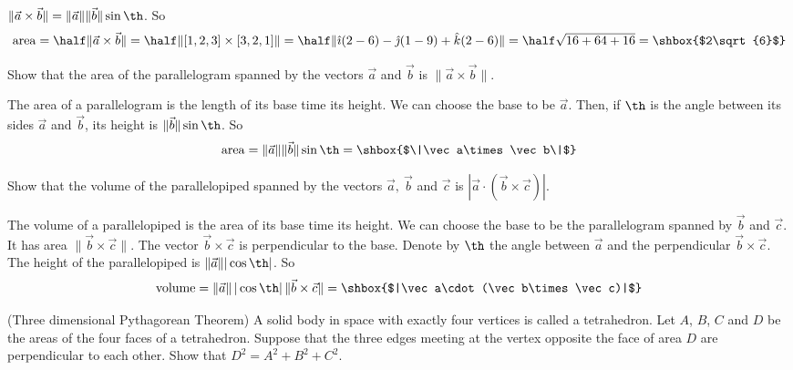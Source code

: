 { $\|\vec a\times\vec b\|=\|\vec a\|\|\vec b\|\sin\th$. So
$$
{\rm area} = \half\|\vec a\times\vec b\|
=\half\|[1,2,3]\times[3,2,1]\|
=\half\| \hat \imath(2-6)-\hat\jmath(1-9) +\hat k(2-6)  \|
=\half\sqrt{16+64+16}=\shbox{$2\sqrt{6}$}
$$
\medskip
\item{\next} Show that the area of the parallelogram spanned by the
vectors $\vec a$ and $\vec b$ is $\|\vec a\times \vec b\|$.
\smallskip\item{}\soln The area of a parallelogram is the length of its
base time its height. We can choose the base to be $\vec a$. Then, if $\th$
is the angle between its sides $\vec a$ and $\vec b$, its height is 
$\|\vec b\|\sin\th$.  
So
$$
{\rm area} = \|\vec a\|\|\vec b\|\sin\th=\shbox{$\|\vec a\times\vec b\|$}
$$
\medskip
\item{\next} Show that the volume of the parallelopiped spanned by the
vectors $\vec a,\ \vec b$ and $\vec c$ is $|\vec a\cdot(\vec b\times\vec
c)|$.
\smallskip\item{}\soln The volume of a parallelopiped is the area of its
base time its height. We can choose the base to be the parallelogram 
spanned by $\vec b$ and $\vec c$. It has area $\|\vec b\times\vec c\|$.
The vector $\vec b\times\vec c$ is perpendicular to the base. Denote by
$\th$ the angle between $\vec a$ and the perpendicular $\vec b\times\vec c$.
The height of the parallelopiped is $\|\vec a\| |\cos\th|$. So 
$$
{\rm volume} = \|\vec a\|\, |\cos\th|\, \|\vec b\times\vec c\|
=\shbox{$|\vec a\cdot(\vec b\times\vec c)|$}
$$
\medskip
\item{\next} (Three dimensional Pythagorean Theorem) A solid body in space 
with exactly four vertices is called a tetrahedron. Let $A$, $B$, $C$ and
$D$ be the areas of the four faces of a tetrahedron. Suppose that the
three edges meeting at the vertex opposite the face of area $D$ are 
perpendicular to each other. Show that $D^2=A^2+B^2+C^2$.

}
